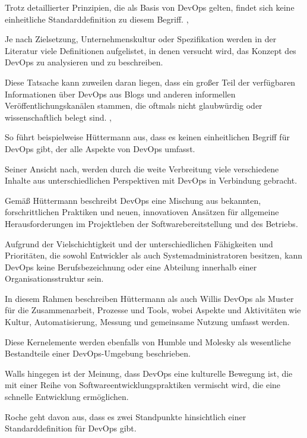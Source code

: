 Trotz detaillierter Prinzipien, die als Basis von DevOps gelten, findet sich keine einheitliche Standarddefinition zu diesem Begriff. \cite{sollner_devops_2017},\cite{smeds_devops_2015}

Je nach Zielsetzung, Unternehmenskultur oder Spezifikation werden in der Literatur viele Definitionen aufgelistet, in denen versucht wird, das Konzept des DevOps zu analysieren und zu beschreiben.

Diese Tatsache kann zuweilen daran liegen, dass ein großer Teil der verfügbaren Informationen über DevOps aus Blogs und anderen informellen Veröffentlichungskanälen stammen, die oftmals nicht glaubwürdig oder wissenschaftlich belegt sind. \cite{smeds_devops_2015},\cite{roche_roche_2011}

So führt beispielweise Hüttermann\cite[S. 3,4]{huttermann_devops_2012} aus, dass es keinen einheitlichen Begriff für DevOps gibt, der alle Aspekte von DevOps umfasst. 

Seiner Ansicht nach, werden durch die weite Verbreitung viele verschiedene Inhalte aus unterschiedlichen Perspektiven mit DevOps in Verbindung gebracht.

Gemäß Hüttermann beschreibt DevOps eine Mischung aus bekannten, forschrittlichen Praktiken und neuen, innovatioven Ansätzen für allgemeine Herausforderungen im Projektleben der Softwarebereitstellung und des Betriebs. 

Aufgrund der Vielschichtigkeit und der unterschiedlichen Fähigkeiten und Prioritäten, die sowohl Entwickler als auch Systemadministratoren besitzen, kann DevOps keine Berufsbezeichnung oder eine Abteilung innerhalb einer Organisationsstruktur sein. \cite[S. 9]{huttermann_devops_2012} 

In diesem Rahmen beschreiben Hüttermann\cite[S. 3,4]{huttermann_devops_2012} als auch Willis\cite{willis_what_2010} DevOps als Muster für die Zusammenarbeit, Prozesse und Tools, wobei Aspekte und Aktivitäten wie Kultur, Automatisierung, Messung und gemeinsame Nutzung umfasst werden.

Diese Kernelemente werden ebenfalls von Humble und Molesky \cite{humble_why_2011} als wesentliche Bestandteile einer DevOps-Umgebung beschrieben. 

Walls \cite[S.1]{walls_building_2013} hingegen ist der Meinung, dass DevOps eine kulturelle Bewegung ist, die mit einer Reihe von Softwareentwicklungspraktiken vermischt wird, die eine schnelle Entwicklung ermöglichen. 

Roche \cite{roche_roche_2011} geht davon aus, dass es zwei Standpunkte hinsichtlich einer Standarddefinition für DevOps gibt. 


